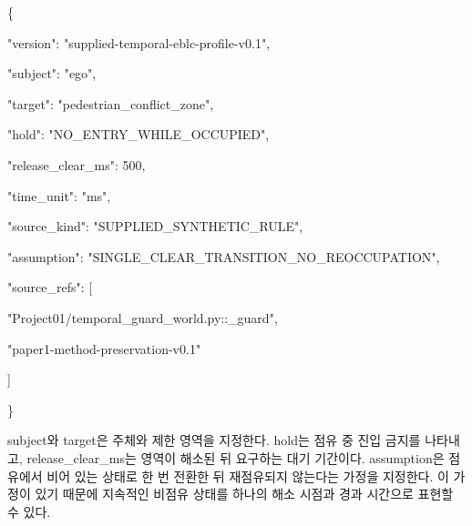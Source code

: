 \documentclass[11pt,a4paper]{article}
\begin{document}
\begingroup\small\ttfamily\setlength{\parskip}{1pt}
\noindent\hspace*{0.0em}\{\par
\noindent\hspace*{1.0em}"version": "supplied-temporal-eblc-profile-v0.1",\par
\noindent\hspace*{1.0em}"subject": "ego",\par
\noindent\hspace*{1.0em}"target": "pedestrian\_\allowbreak{}conflict\_\allowbreak{}zone",\par
\noindent\hspace*{1.0em}"hold": "NO\_\allowbreak{}ENTRY\_\allowbreak{}WHILE\_\allowbreak{}OCCUPIED",\par
\noindent\hspace*{1.0em}"release\_\allowbreak{}clear\_\allowbreak{}ms": 500,\par
\noindent\hspace*{1.0em}"time\_\allowbreak{}unit": "ms",\par
\noindent\hspace*{1.0em}"source\_\allowbreak{}kind": "SUPPLIED\_\allowbreak{}SYNTHETIC\_\allowbreak{}RULE",\par
\noindent\hspace*{1.0em}"assumption": "SINGLE\_\allowbreak{}CLEAR\_\allowbreak{}TRANSITION\_\allowbreak{}NO\_\allowbreak{}REOCCUPATION",\par
\noindent\hspace*{1.0em}"source\_\allowbreak{}refs": [\par
\noindent\hspace*{2.0em}"Project01/temporal\_\allowbreak{}guard\_\allowbreak{}world.py::\_\allowbreak{}guard",\par
\noindent\hspace*{2.0em}"paper1-method-preservation-v0.1"\par
\noindent\hspace*{1.0em}]\par
\noindent\hspace*{0.0em}\}\par\endgroup\par

{\ttfamily\small subject}와 {\ttfamily\small target}은 주체와 제한 영역을 지정한다. {\ttfamily\small hold}는 점유 중 진입 금지를 나타내고, {\ttfamily\small release\_\allowbreak{}clear\_\allowbreak{}ms}는 영역이 해소된 뒤 요구하는 대기 기간이다. {\ttfamily\small assumption}은 점유에서 비어 있는 상태로 한 번 전환한 뒤 재점유되지 않는다는 가정을 지정한다. 이 가정이 있기 때문에 지속적인 비점유 상태를 하나의 해소 시점과 경과 시간으로 표현할 수 있다.\par
\end{document}
